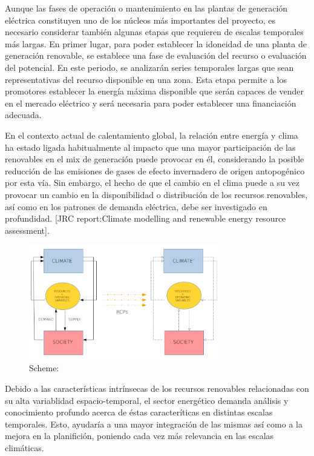 Aunque las fases de operación o mantenimiento en las plantas de generación eléctrica constituyen uno de los núcleos más importantes del proyecto, es necesario considerar también algunas etapas que requieren de escalas temporales más largas. En primer lugar, para poder establecer la idoneidad de una planta de generación renovable, se establece una fase de evaluación del recurso o evaluación del potencial. En este periodo, se analizarán series temporales largas que sean representativas del recurso disponible en una zona. Esta etapa permite a los promotores establecer la energía máxima disponible que serán capaces de vender en el mercado eléctrico y será necesaria para poder establecer una financiación adecuada.

En el contexto actual de calentamiento global, la relación entre energía y clima ha estado ligada habitualmente al impacto que una mayor participación de las renovables en el mix de generación puede provocar en él, considerando la posible reducción de las emisiones de gases de efecto invernadero de origen antopogénico por esta vía. Sin embargo, el hecho de que el cambio en el clima puede a su vez provocar un cambio en la disponibilidad o distribución de los recursos renovables, así como en los patrones de demanda eléctrica, debe ser investigado en profundidad. [JRC report:Climate modelling and renewable energy resource assessment].

\begin{figure}[h!]
\centering\includegraphics[width=0.75\textwidth]{figs/esquema.pdf}
\caption{Scheme: }
\label{fig:feedback}
\end{figure}

Debido a las características intrínsecas de los recursos renovables relacionadas con su alta variablidad espacio-temporal, el sector energético demanda análisis y conocimiento profundo acerca de éstas caracteríticas en distintas escalas temporales. Esto, ayudaría a una mayor integración de las mismas así como a la mejora en la planifición, poniendo cada vez más relevancia en las escalas climáticas.

